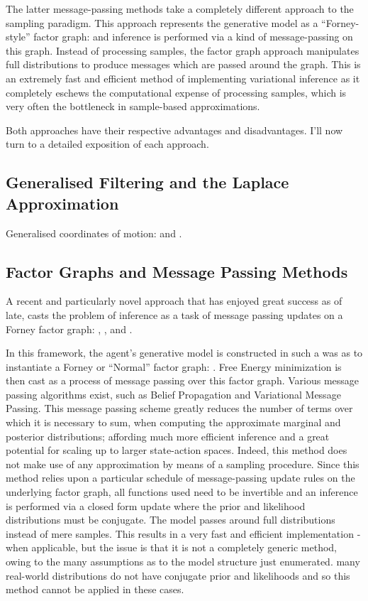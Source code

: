 \documentclass[onecolumn]{IEEEtran}
\begin{document}
The latter message-passing methods take a completely different approach to the sampling paradigm. This approach represents the generative model as a ``Forney-style'' factor graph: \textcite{Codes-on-Graphs} and inference is performed via a kind of message-passing on this graph.  
Instead of processing samples, the factor graph approach manipulates full distributions to produce messages which are passed around the graph. This is an extremely fast and efficient method of implementing variational inference as it completely eschews the computational expense of processing samples, which is very often the bottleneck in sample-based approximations. 

Both approaches have their respective advantages and disadvantages. I'll now turn to a detailed exposition of each approach. 

\subsection{Generalised Filtering and the Laplace Approximation}

Generalised coordinates of motion: \textcite{Generalized-Filtering} and \textcite{Bayes-State-Estimation}.

\subsection{Factor Graphs and Message Passing Methods}

A recent and particularly novel approach that has enjoyed great success as of late, casts the problem of inference as a task of message passing updates on a Forney factor graph: \textcite{Factor-Graph-Approach-Automated-Design-Bayesian-Algos}, \textcite{Simulating-AIF-By-Message-Passing}, \textcite{Factor-Graph-Desc-Deep-Temp-AIF} and \textcite{Reactive-MP}. 

In this framework, the agent's generative model is constructed in such a was as to instantiate a Forney or ``Normal'' factor graph: \textcite{Codes-on-Graphs}. Free Energy minimization is then cast as a process of message passing over this factor graph. Various message passing algorithms exist, such as Belief Propagation and Variational Message Passing. This message passing scheme greatly reduces the number of terms over which it is necessary to sum, when computing the approximate marginal and posterior distributions; affording much more efficient inference and a great potential for scaling up to larger state-action spaces. Indeed, this method does not make use of any approximation by means of a sampling procedure. Since this method relies upon a particular schedule of message-passing update rules on the underlying factor graph, all functions used need to be invertible and an inference is performed via a closed form update where the prior and likelihood distributions must be conjugate. The model passes around full distributions instead of mere samples. This results in a very fast and efficient implementation - when applicable, but the issue is that it is not a completely generic method, owing to the many assumptions as to the model structure just enumerated. many real-world distributions do not have conjugate prior and likelihoods and so this method cannot be applied in these cases.
\end{document}
